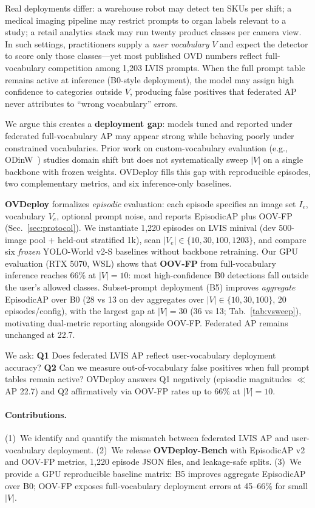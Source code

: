 \documentclass[10pt,twocolumn,letterpaper]{article}
\begin{document}
Real deployments differ: a warehouse robot may detect ten SKUs per shift; a medical imaging pipeline may restrict prompts to organ labels relevant to a study; a retail analytics stack may run twenty product classes per camera view.
In such settings, practitioners supply a \emph{user vocabulary} $V$ and expect the detector to score only those classes---yet most published OVD numbers reflect full-vocabulary competition among 1,203 LVIS prompts.
When the full prompt table remains active at inference (B0-style deployment), the model may assign high confidence to categories outside $V$, producing false positives that federated AP never attributes to ``wrong vocabulary'' errors.

We argue this creates a \textbf{deployment gap}: models tuned and reported under federated full-vocabulary AP may appear strong while behaving poorly under constrained vocabularies.
Prior work on custom-vocabulary evaluation (e.g., ODinW~\cite{miller2021odinw}) studies domain shift but does not systematically sweep $|V|$ on a single backbone with frozen weights.
OVDeploy fills this gap with reproducible episodes, two complementary metrics, and six inference-only baselines.

\textbf{OVDeploy} formalizes \emph{episodic} evaluation: each episode specifies an image set $I_e$, vocabulary $V_e$, optional prompt noise, and reports EpisodicAP plus OOV-FP (Sec.~\ref{sec:protocol}).
We instantiate 1,220 episodes on LVIS minival (dev 500-image pool + held-out stratified 1k), scan $|V_e| \in \{10,30,100,1203\}$, and compare six \emph{frozen} YOLO-World v2-S baselines without backbone retraining.
Our GPU evaluation (RTX 5070, WSL) shows that \textbf{OOV-FP} from full-vocabulary inference reaches 66\% at $|V|{=}10$: most high-confidence B0 detections fall outside the user's allowed classes.
Subset-prompt deployment (B5) improves \emph{aggregate} EpisodicAP over B0 (28 vs 13 on dev aggregates over $|V|{\in}\{10,30,100\}$, 20 episodes/config), with the largest gap at $|V|{=}30$ (36 vs 13; Tab.~\ref{tab:vsweep}), motivating dual-metric reporting alongside OOV-FP.
Federated AP remains unchanged at 22.7.

We ask: \textbf{Q1} Does federated LVIS AP reflect user-vocabulary deployment accuracy?
\textbf{Q2} Can we measure out-of-vocabulary false positives when full prompt tables remain active?
OVDeploy answers Q1 negatively (episodic magnitudes $\ll$ AP 22.7) and Q2 affirmatively via OOV-FP rates up to 66\% at $|V|{=}10$.

\paragraph{Contributions.}
(1)~We identify and quantify the mismatch between federated LVIS AP and user-vocabulary deployment.
(2)~We release \textbf{OVDeploy-Bench} with EpisodicAP v2 and OOV-FP metrics, 1,220 episode JSON files, and leakage-safe splits.
(3)~We provide a GPU reproducible baseline matrix: B5 improves aggregate EpisodicAP over B0; OOV-FP exposes full-vocabulary deployment errors at 45--66\% for small $|V|$.
\end{document}
